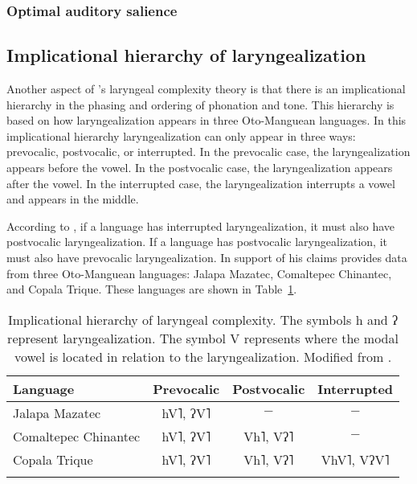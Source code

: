 \subsubsection{Optimal auditory salience}\label{sec:optimal_auditory_salience}


\subsection{Implicational hierarchy of laryngealization}\label{sec:implicational_hierarchy}

Another aspect of \citeauthor{silvermanLaryngealComplexityOtomanguean1997}'s \citeyear{silvermanLaryngealComplexityOtomanguean1997} laryngeal complexity theory is that there is an implicational hierarchy in the phasing and ordering of phonation and tone. This hierarchy is based on how laryngealization appears in three Oto-Manguean languages. In this implicational hierarchy laryngealization can only appear in three ways: prevocalic, postvocalic, or interrupted. In the prevocalic case, the laryngealization appears before the vowel. In the postvocalic case, the laryngealization appears after the vowel. In the interrupted case, the laryngealization interrupts a vowel and appears in the middle.

According to \citet{silvermanLaryngealComplexityOtomanguean1997}, if a language has interrupted laryngealization, it must also have postvocalic laryngealization. If a language has postvocalic laryngealization, it must also have prevocalic laryngealization. In support of his claims \citet{silvermanLaryngealComplexityOtomanguean1997} provides data from three Oto-Manguean languages: Jalapa Mazatec, Comaltepec Chinantec, and Copala Trique. These languages are shown in Table~\ref{tab:implicational_hierarchy}.

\begin{table}[!ht]
    \centering
    \caption{Implicational hierarchy of laryngeal complexity. The symbols h and ʔ represent laryngealization. The symbol V represents where the modal vowel is located in relation to the laryngealization.  Modified from \citet{silvermanLaryngealComplexityOtomanguean1997}.} 
    \label{tab:implicational_hierarchy}
    \begin{tabular}{lccc}
        \lsptoprule
        \textbf{Language} & \textbf{Prevocalic} & \textbf{Postvocalic} & \textbf{Interrupted} \\
        \hline 
        Jalapa Mazatec & hV˥, ʔV˥ & $-$ & $-$ \\
        Comaltepec Chinantec & hV˥, ʔV˥ & Vh˥, Vʔ˥ & $-$ \\
        Copala Trique & hV˥, ʔV˥ & Vh˥, Vʔ˥ & VhV˥, VʔV˥ \\
        \lspbottomrule
    \end{tabular}
\end{table}

